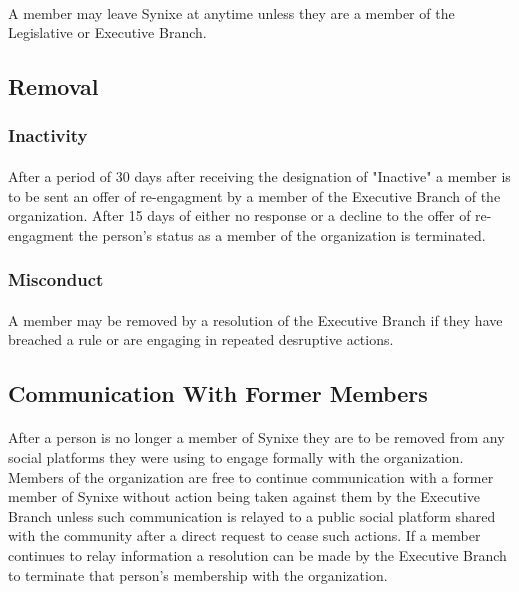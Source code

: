 \documentclass[10pt,a4paper]{article}
\begin{document}
\paragraph{}
A member may leave Synixe at anytime unless they are a member of the Legislative or Executive Branch.
\subsection{Removal} \label{member-removal}
\subsubsection{Inactivity}
\paragraph{}
After a period of 30 days after receiving the designation of "Inactive" a member is to be sent an offer of re-engagment by a member of the Executive Branch of the organization. After 15 days of either no response or a decline to the offer of re-engagment the person's status as a member of the organization is terminated.
\subsubsection{Misconduct} \label{misconduct}
\paragraph{}
A member may be removed by a resolution of the Executive Branch if they have breached a rule or are engaging in repeated desruptive actions.
\subsection{Communication With Former Members} \label{communication-former-members}
\paragraph{}
 After a person is no longer a member of Synixe they are to be removed from any social platforms they were using to engage formally with the organization. Members of the organization are free to continue communication with a former member of Synixe without action being taken against them by the Executive Branch unless such communication is relayed to a public social platform shared with the community after a direct request to cease such actions. If a member continues to relay information a resolution can be made by the Executive Branch to terminate that person's membership with the organization.
\end{document}
